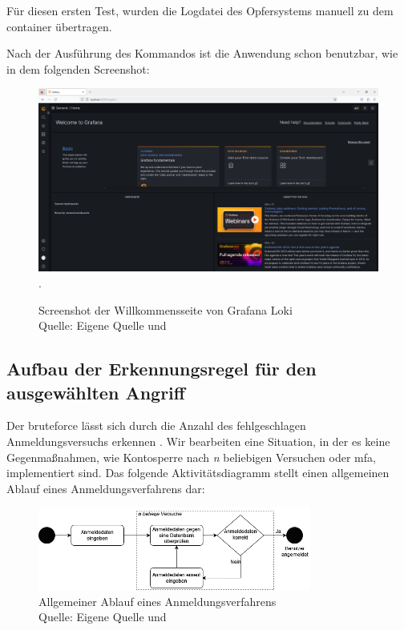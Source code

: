 Für diesen ersten Test, wurden die Logdatei des Opfersystems manuell zu dem \gls{container} übertragen.

\newpage
\thispagestyle{lscape}
\begin{landscape}
   Nach der Ausführung des Kommandos ist die Anwendung schon benutzbar, wie in dem folgenden Screenshot:
   \begin{center}
      \begin{figure}[H]
         \centering
         \includegraphics[width=1.3\textwidth]{assets/Installation_Grafana.png}.
         \caption{Screenshot der Willkommensseite von Grafana Loki\\Quelle: Eigene Quelle und \citep{Grafana_Logs}}
         \centering
      \end{figure}
   \end{center}
\end{landscape}

\subsection{Aufbau der Erkennungsregel für den ausgewählten Angriff}
Der \gls{bruteforce} lässt sich durch die Anzahl des fehlgeschlagen Anmeldungsversuchs erkennen \citep{Selvaganesh_SplunkBruteForce}. Wir bearbeiten eine Situation, in der es keine Gegenmaßnahmen, wie Kontosperre nach \textit{n} beliebigen Versuchen oder \gls{mfa}, implementiert sind. Das folgende Aktivitätsdiagramm stellt einen allgemeinen Ablauf eines Anmeldungsverfahrens dar:

\begin{figure}[H]
   \centering
   \includegraphics[width=0.8\textwidth]{assets/Anmeldeverfahren.drawio.png}
   \caption{Allgemeiner Ablauf eines Anmeldungsverfahrens \\Quelle: Eigene Quelle und \citep{Selvaganesh_SplunkBruteForce}}
   \centering
\end{figure}

